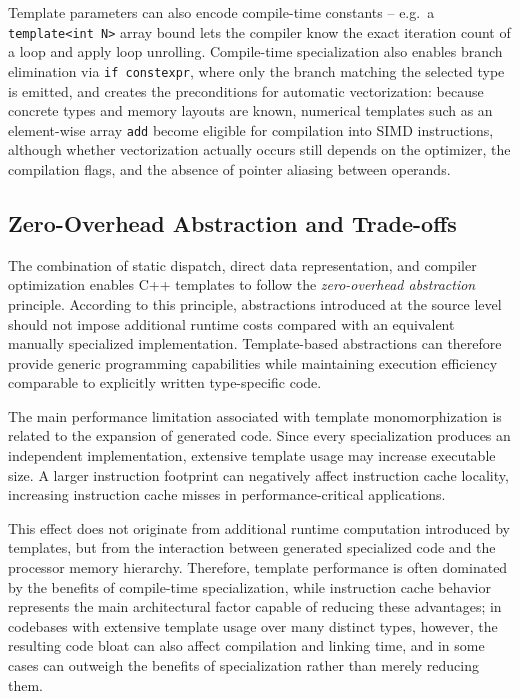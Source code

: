 \documentclass[11pt]{report}
\begin{document}
Template parameters can also encode compile-time constants -- e.g.\ a
\texttt{template<int N>} array bound lets the compiler know the exact iteration
count of a loop and apply loop unrolling. Compile-time specialization also enables branch elimination via
\texttt{if constexpr}, where only the branch matching the selected type is
emitted, and creates the preconditions for automatic vectorization: because
concrete types and memory layouts are known, numerical templates such as an
element-wise array \texttt{add} become eligible for compilation into SIMD
instructions, although whether vectorization actually occurs still depends
on the optimizer, the compilation flags, and the absence of pointer aliasing
between operands.

\subsection{Zero-Overhead Abstraction and Trade-offs}
\label{CppTemplates:Performance:Zero-Overhead}

The combination of static dispatch, direct data representation, and compiler
optimization enables C++ templates to follow the
\emph{zero-overhead abstraction} principle. According to this principle,
abstractions introduced at the source level should not impose additional
runtime costs compared with an equivalent manually specialized
implementation. Template-based abstractions can therefore provide generic
programming capabilities while maintaining execution efficiency comparable to
explicitly written type-specific code.

The main performance limitation associated with template monomorphization is
related to the expansion of generated code. Since every specialization
produces an independent implementation, extensive template usage may increase
executable size. A larger instruction footprint can negatively affect
instruction cache locality, increasing instruction cache misses in
performance-critical applications.

This effect does not originate from additional runtime computation introduced
by templates, but from the interaction between generated specialized code and
the processor memory hierarchy. Therefore, template performance is often dominated by the benefits of
compile-time specialization, while instruction cache behavior represents the
main architectural factor capable of reducing these advantages; in codebases
with extensive template usage over many distinct types, however, the
resulting code bloat can also affect compilation and linking time, and in
some cases can outweigh the benefits of specialization rather than merely
reducing them.
\end{document}
